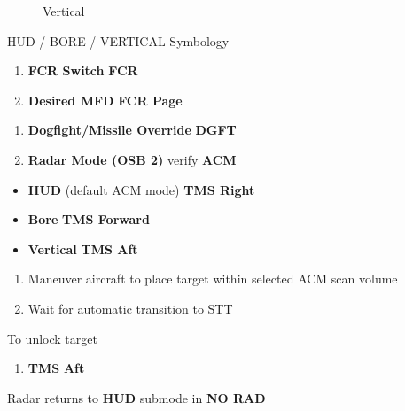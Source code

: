 \begin{checklistenumerate}
{\begin{subfigure}[t]{0.45\linewidth}
            \caption{Vertical}
        \end{subfigure}
        \caption{HUD / BORE / VERTICAL Symbology}
    }
    \begin{enumerate}
        \item \textbf{FCR Switch} \dotfill \textbf{FCR}
        \item \textbf{Desired MFD} \dotfill \textbf{FCR Page}
    \end{enumerate}
    \begin{enumerate}
        \item \textbf{Dogfight/Missile Override} \dotfill \textbf{DGFT}
        \item \textbf{Radar Mode (OSB 2)} \dotfill verify \textbf{ACM}
    \end{enumerate}
    \begin{itemize}
        \item \textbf{HUD} (default ACM mode) \dotfill \textbf{TMS Right}
        \item \textbf{Bore} \dotfill \textbf{TMS Forward}
        \item \textbf{Vertical} \dotfill \textbf{TMS Aft}
    \end{itemize}
    \begin{enumerate}
        \item Maneuver aircraft to place target within selected ACM scan volume 
        \item Wait for automatic transition to STT 
    \end{enumerate}
    To unlock target
    \begin{enumerate}
        \item \textbf{TMS} \dotfill \textbf{Aft}
    \end{enumerate}
    Radar returns to \textbf{HUD} submode in \textbf{NO RAD} 
    
\end{checklistenumerate}


